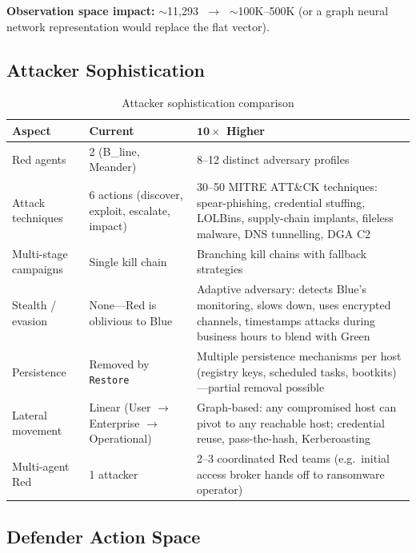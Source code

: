 \documentclass[11pt,a4paper]{article}
\begin{document}
\noindent
\textbf{Observation space impact:} $\sim$11,293 $\;\longrightarrow\;$ $\sim$100K--500K
(or a graph neural network representation would replace the flat vector).

\subsection{Attacker Sophistication}

\begin{table}[h!]
\centering
\caption{Attacker sophistication comparison}
\label{tab:attacker}
\begin{tabularx}{\textwidth}{@{} l X X @{}}
\toprule
\textbf{Aspect} & \textbf{Current} & \textbf{$\mathbf{10\times}$ Higher} \\
\midrule
Red agents & 2 (B\_line, Meander) & 8--12 distinct adversary profiles \\[3pt]
Attack techniques & 6 actions (discover, exploit, escalate, impact) &
    30--50 MITRE ATT\&CK techniques: spear-phishing, credential stuffing,
    LOLBins, supply-chain implants, fileless malware, DNS tunnelling, DGA C2 \\[3pt]
Multi-stage campaigns & Single kill chain &
    Branching kill chains with fallback strategies \\[3pt]
Stealth / evasion & None---Red is oblivious to Blue &
    Adaptive adversary: detects Blue's monitoring, slows down, uses encrypted
    channels, timestamps attacks during business hours to blend with Green \\[3pt]
Persistence & Removed by \texttt{Restore} &
    Multiple persistence mechanisms per host (registry keys, scheduled tasks,
    bootkits)---partial removal possible \\[3pt]
Lateral movement & Linear (User $\to$ Enterprise $\to$ Operational) &
    Graph-based: any compromised host can pivot to any reachable host;
    credential reuse, pass-the-hash, Kerberoasting \\[3pt]
Multi-agent Red & 1 attacker &
    2--3 coordinated Red teams (e.g.\ initial access broker hands off
    to ransomware operator) \\
\bottomrule
\end{tabularx}
\end{table}

\subsection{Defender Action Space}
\end{document}
